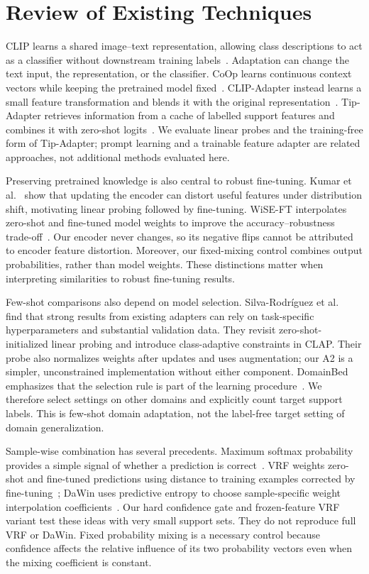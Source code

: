 \section{Review of Existing Techniques}
\label{sec:related}
CLIP learns a shared image--text representation, allowing class descriptions to act as a classifier without downstream training labels~\citep{radford2021clip}. Adaptation can change the text input, the representation, or the classifier. CoOp learns continuous context vectors while keeping the pretrained model fixed~\citep{zhou2022coop}. CLIP-Adapter instead learns a small feature transformation and blends it with the original representation~\citep{gao2024adapter}. Tip-Adapter retrieves information from a cache of labelled support features and combines it with zero-shot logits~\citep{zhang2022tip}. We evaluate linear probes and the training-free form of Tip-Adapter; prompt learning and a trainable feature adapter are related approaches, not additional methods evaluated here.

Preserving pretrained knowledge is also central to robust fine-tuning. Kumar et al.~\citep{kumar2022lpft} show that updating the encoder can distort useful features under distribution shift, motivating linear probing followed by fine-tuning. WiSE-FT interpolates zero-shot and fine-tuned model weights to improve the accuracy--robustness trade-off~\citep{wortsman2022wiseft}. Our encoder never changes, so its negative flips cannot be attributed to encoder feature distortion. Moreover, our fixed-mixing control combines output probabilities, rather than model weights. These distinctions matter when interpreting similarities to robust fine-tuning results.

Few-shot comparisons also depend on model selection. Silva-Rodríguez et al.~\citep{silva2024clap} find that strong results from existing adapters can rely on task-specific hyperparameters and substantial validation data. They revisit zero-shot-initialized linear probing and introduce class-adaptive constraints in CLAP. Their probe also normalizes weights after updates and uses augmentation; our A2 is a simpler, unconstrained implementation without either component. DomainBed emphasizes that the selection rule is part of the learning procedure~\citep{gulrajani2021domainbed}. We therefore select settings on other domains and explicitly count target support labels. This is few-shot domain adaptation, not the label-free target setting of domain generalization.

Sample-wise combination has several precedents. Maximum softmax probability provides a simple signal of whether a prediction is correct~\citep{hendrycks2017msp}. VRF weights zero-shot and fine-tuned predictions using distance to training examples corrected by fine-tuning~\citep{zhu2024vrf}; DaWin uses predictive entropy to choose sample-specific weight interpolation coefficients~\citep{oh2025dawin}. Our hard confidence gate and frozen-feature VRF variant test these ideas with very small support sets. They do not reproduce full VRF or DaWin. Fixed probability mixing is a necessary control because confidence affects the relative influence of its two probability vectors even when the mixing coefficient is constant.

